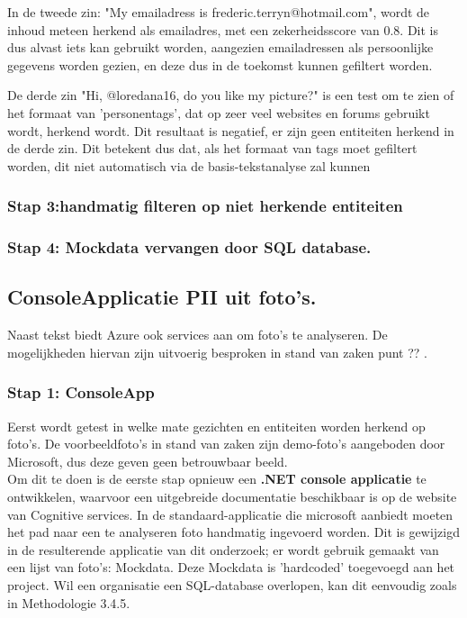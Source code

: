 In de tweede zin: "My emailadress is frederic.terryn@hotmail.com", wordt de inhoud meteen herkend als emailadres, met een zekerheidsscore van 0.8. Dit is dus alvast iets kan gebruikt worden, aangezien emailadressen als persoonlijke gegevens worden gezien, en deze dus in de toekomst kunnen gefiltert worden. 

De derde zin "Hi, @loredana16, do you like my picture?" is een test om te zien of het formaat van 'personentags', dat op zeer veel websites en forums gebruikt wordt, herkend wordt. Dit resultaat is negatief, er zijn geen entiteiten herkend in de derde zin. Dit betekent dus dat, als het formaat van tags moet gefiltert worden, dit niet automatisch via de basis-tekstanalyse zal kunnen


\subsubsection{Stap 3:handmatig filteren op niet herkende entiteiten}

\subsubsection{Stap 4: Mockdata vervangen door SQL database.}

\subsection{ConsoleApplicatie PII uit foto's.}
Naast tekst biedt Azure ook services aan om foto's te analyseren. De mogelijkheden hiervan zijn uitvoerig besproken in stand van zaken punt ?? . 

\subsubsection{Stap 1: ConsoleApp}

Eerst wordt getest in welke mate gezichten en entiteiten worden herkend op foto's. De voorbeeldfoto's in stand van zaken zijn demo-foto's aangeboden door Microsoft, dus deze geven geen betrouwbaar beeld. \\
Om dit te doen is de eerste stap opnieuw een \textbf{.NET console applicatie} te ontwikkelen, waarvoor een uitgebreide documentatie beschikbaar is op de website van Cognitive services. 
In de standaard-applicatie die microsoft aanbiedt moeten het pad naar een te analyseren foto handmatig ingevoerd worden. 
Dit is gewijzigd in de resulterende applicatie van dit onderzoek; er wordt gebruik gemaakt van een lijst van foto's: Mockdata. Deze Mockdata is 'hardcoded' toegevoegd aan het project. Wil een organisatie een SQL-database overlopen, kan dit eenvoudig zoals in Methodologie 3.4.5. 

